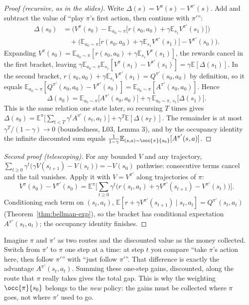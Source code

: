 \documentclass[11pt,a4paper]{article}
\newcommand{\E}{\mathbb{E}}
\theoremstyle{plain}
\theoremstyle{definition}
\theoremstyle{remark}
\begin{document}
\begin{proof}[Proof (recursive, as in the slides)]
Write $\Delta(s)=V^\pi(s)-V^{\pi'}(s)$. Add and subtract the value of ``play $\pi$'s first action, then continue with $\pi'$'':
\begin{align*}
\Delta(s_0)&=\Big(V^\pi(s_0)-\E_{a_0\sim\pi}\big[r(s_0,a_0)+\gamma\E_{s_1}V^{\pi'}(s_1)\big]\Big)\\
&\quad+\Big(\E_{a_0\sim\pi}\big[r(s_0,a_0)+\gamma\E_{s_1}V^{\pi'}(s_1)\big]-V^{\pi'}(s_0)\Big).
\end{align*}
Expanding $V^\pi(s_0)=\E_{a_0\sim\pi}[r(s_0,a_0)+\gamma\E_{s_1}V^\pi(s_1)]$, the rewards cancel in the first bracket, leaving $\gamma\E_{a_0\sim\pi}\E_{s_1}[V^\pi(s_1)-V^{\pi'}(s_1)]=\gamma\E[\Delta(s_1)]$. In the second bracket, $r(s_0,a_0)+\gamma\E_{s_1}V^{\pi'}(s_1)=Q^{\pi'}(s_0,a_0)$ by definition, so it equals $\E_{a_0\sim\pi}[Q^{\pi'}(s_0,a_0)-V^{\pi'}(s_0)]=\E_{a_0\sim\pi}[A^{\pi'}(s_0,a_0)]$. Hence
\[
\Delta(s_0)=\E_{a_0\sim\pi}\big[A^{\pi'}(s_0,a_0)\big]+\gamma\,\E_{a_0\sim\pi,\,s_1}\big[\Delta(s_1)\big].
\]
This is the same relation one state later, so recursing $T$ times gives $\Delta(s_0)=\E^\pi\big[\sum_{t<T}\gamma^tA^{\pi'}(s_t,a_t)\big]+\gamma^T\E[\Delta(s_T)]$. The remainder is at most $\gamma^T/(1-\gamma)\to0$ (boundedness, L03, Lemma 3), and by the occupancy identity the infinite discounted sum equals $\frac1{1-\gamma}\E_{(s,a)\sim\occ{\pi}{s_0}}[A^{\pi'}(s,a)]$.
\end{proof}

\begin{proof}[Second proof (telescoping)]
For any bounded $V$ and any trajectory, $\sum_{t\ge0}\gamma^t\big(\gamma V(s_{t+1})-V(s_t)\big)=-V(s_0)$ pathwise: consecutive terms cancel and the tail vanishes. Apply it with $V=V^{\pi'}$ along trajectories of $\pi$:
\[
V^\pi(s_0)-V^{\pi'}(s_0)=\E^\pi\Big[\sum_{t\ge0}\gamma^t\big(r(s_t,a_t)+\gamma V^{\pi'}(s_{t+1})-V^{\pi'}(s_t)\big)\Big].
\]
Conditioning each term on $(s_t,a_t)$, $\E[r+\gamma V^{\pi'}(s_{t+1})\mid s_t,a_t]=Q^{\pi'}(s_t,a_t)$ (Theorem~\ref{thm:bellman-exp}), so the bracket has conditional expectation $A^{\pi'}(s_t,a_t)$; the occupancy identity finishes.
\end{proof}

\begin{intuition}
Imagine $\pi$ and $\pi'$ as two routes and the discounted value as the money collected. Switch from $\pi'$ to $\pi$ one step at a time: at step $t$ you compare ``take $\pi$'s action here, then follow $\pi'$'' with ``just follow $\pi'$''. That difference is exactly the advantage $A^{\pi'}(s_t,a_t)$. Summing these one-step gains, discounted, along the route that $\pi$ really takes gives the total gap. This is why the weighting $\occ{\pi}{s_0}$ belongs to the \emph{new} policy: the gains must be collected where $\pi$ goes, not where $\pi'$ used to go.
\end{intuition}
\end{document}
